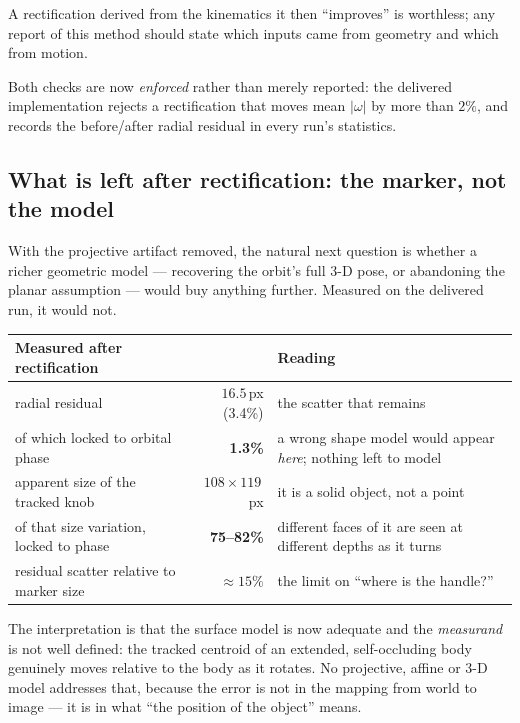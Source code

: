 \documentclass[11pt,a4paper]{article}
\begin{document}
A rectification derived from the kinematics it then ``improves'' is worthless; any report of
this method should state which inputs came from geometry and which from motion.

Both checks are now \emph{enforced} rather than merely reported: the delivered implementation
rejects a rectification that moves mean $|\omega|$ by more than $2\%$, and records the
before/after radial residual in every run's statistics.

\subsection{What is left after rectification: the marker, not the model}
\label{sec:marker}

With the projective artifact removed, the natural next question is whether a richer geometric
model --- recovering the orbit's full 3-D pose, or abandoning the planar assumption --- would buy
anything further. Measured on the delivered run, it would not.

\begin{center}
\footnotesize
\begin{tabular}{p{7.4cm}rp{4.4cm}}
\toprule
Measured after rectification & & Reading \\
\midrule
radial residual & $16.5$\,px (3.4\%) & the scatter that remains \\
\quad of which locked to orbital phase & \textbf{1.3\%} & a wrong shape model would appear
\emph{here}; nothing left to model \\
apparent size of the tracked knob & $108\times119$\,px & it is a solid object, not a point \\
\quad of that size variation, locked to phase & \textbf{75--82\%} & different faces of it are seen
at different depths as it turns \\
residual scatter relative to marker size & $\approx 15\%$ & the limit on ``where is the handle?'' \\
\bottomrule
\end{tabular}
\end{center}

The interpretation is that the surface model is now adequate and the \emph{measurand} is not
well defined: the tracked centroid of an extended, self-occluding body genuinely moves relative to
the body as it rotates. No projective, affine or 3-D model addresses that, because the error is
not in the mapping from world to image --- it is in what ``the position of the object'' means.
\end{document}
